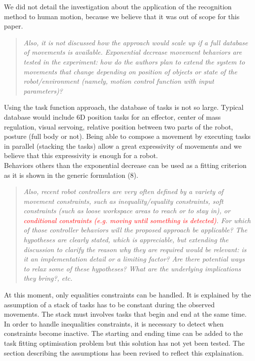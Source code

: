 \documentclass[11pt]{article}
\newcommand{\red}[1]{{\textcolor{red}{#1}}}
\begin{document}
We did not detail the investigation about the application of the recognition
method to human motion, because we believe that
it was out of scope for this paper.

\begin{quote}
\textit{
Also, it is not discussed how the approach would scale up if a full database of movements is available. Exponential decrease movement behaviors are tested in the experiment: how do the authors plan to extend the system to movements that change depending on position of objects or state of the robot/environment (namely, motion control function with input parameters)?
}
\end{quote}
Using the task function approach,
the database of tasks is not so large. Typical database would include
6D position tasks for an effector, center of mass regulation, 
   visual servoing, relative position between two parts of the robot, 
   posture (full body or not).
  Being able to compose a movement by executing tasks in parallel (stacking the tasks)
  allow a great expressivity of movements and we believe that this expressivity
  is enough for a robot. \\

  Behaviors others than the exponential decrease can be
  used as a fitting criterion as it is shown in the generic formulation (8).

\begin{quote}
\textit{
  Also, recent robot controllers are very often defined by a variety of movement constraints, such as inequality/equality constraints, soft constraints (such as loose workspace areas to reach or to stay in), or \red{conditional constraints (e.g. moving until something is detected)}. For which of those controller behaviors will the proposed approach be applicable?
  The hypotheses are clearly stated, which is appreciable, but extending the discussion to clarify the reason why they are required would be relevant: is it an implementation detail or a limiting factor? Are there potential ways to relax some of these hypotheses? What are the underlying implications they bring?, etc.
}
\end{quote}
At this moment, only equalities constraints can be handled. It is explained by the assumption of a stack
of tasks has to be constant during the observed movements.
The stack must involves tasks that begin and end at the same time.
In order to handle inequalities constraints, it is necessary to detect
when constraints become inactive. The starting and ending time can be added
to the task fitting optimisation problem but this solution has not yet been tested.
The section describing the assumptions has been revised to reflect this explaination.
\end{document}
